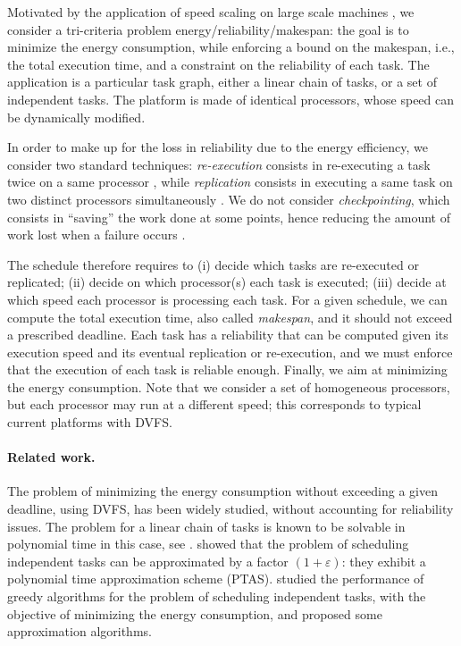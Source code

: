 \documentclass[a4paper]{article}
\theoremstyle{plain}
\theoremstyle{definition}
\theoremstyle{remark}
\begin{document}
Motivated by the application of speed scaling on large scale machines
\cite{Oliner04}, we consider a tri-criteria problem
energy/reliability/makespan: the goal is to minimize the energy
consumption, while enforcing a bound on the makespan, i.e., the total
execution time, and a constraint on the reliability of each task.  The
application is a particular task graph, either a linear chain of
tasks, or a set of independent tasks. The platform is made of
identical processors, whose speed can be dynamically modified. 

In order to make up for the loss in reliability due to the energy
efficiency, we consider two standard techniques: \emph{re-execution}
consists in re-executing a task twice on a same processor
\cite{Zhu04EEM,Zhu06}, while \emph{replication} consists in executing
a same task on two distinct processors simultaneously
\cite{Assayad11}. We do not consider \emph{checkpointing}, which
consists in ``saving'' the work done at some points, hence reducing
the amount of work lost when a failure occurs
\cite{Melhem03CP,Zhang03CP}.
 
The schedule therefore requires to (i) decide which tasks are
re-executed or replicated; (ii) decide on which processor(s) each task
is executed; (iii) decide at which speed each processor is processing
each task. For a given schedule, we can compute the total execution
time, also called {\em makespan}, and it should not exceed a
prescribed deadline. Each task has a reliability that can be computed
given its execution speed and its eventual replication or
re-execution, and we must enforce that the execution of each task is
reliable enough.  Finally, we aim at minimizing the energy
consumption.  Note that we consider a set of homogeneous processors,
but each processor may run at a different speed; this corresponds to
typical current platforms with DVFS. 


\paragraph{Related work.}
The problem of minimizing the energy consumption without exceeding a
given deadline, using DVFS, has been widely studied, without
accounting for reliability issues.  The problem for a linear chain of
tasks is known to be solvable in polynomial time in this case, see
\cite{aupy12ccpe}. \cite{Alon97} showed that the problem of
scheduling independent tasks can be approximated by a factor
$(1+\varepsilon)$: they exhibit a polynomial time approximation scheme
(PTAS). \cite{RenaudGoudGreedy} studied the performance of greedy
algorithms for the problem of scheduling independent tasks, with the
objective of minimizing the energy consumption, and proposed some
approximation algorithms.
\end{document}

